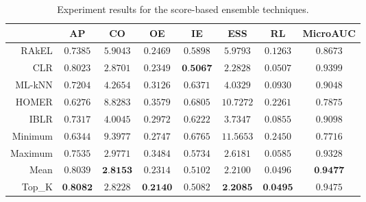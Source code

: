 \begin{table*}[ht]
	\begin{center}
	\label{tab:score-table}
		\begin{tabular}{rccccccc}
		\toprule
			 & AP & CO & OE & IE & ESS & RL & MicroAUC\\
			\midrule
			RAkEL & $0.7385$ & $5.9043$ & $0.2469$ & $0.5898$ & $5.9793$ & $0.1263$ & $0.8673$\\
			CLR & $0.8023$ & $2.8701$ & $0.2349$ & $\textbf{0.5067}$ & $2.2828$ & $0.0507$ & $0.9399$\\
			ML-kNN & $0.7204$ & $4.2654$ & $0.3126$ & $0.6371$ & $4.0329$ & $0.0930$ & $0.9048$\\
			HOMER & $0.6276$ & $8.8283$ & $0.3579$ & $0.6805$ & $10.7272$ & $0.2261$ & $0.7875$\\
			IBLR & $0.7317$ & $4.0045$ & $0.2972$ & $0.6222$ & $3.7347$ & $0.0855$ & $0.9098$\\
			Minimum & $0.6344$ & $9.3977$ & $0.2747$ & $0.6765$ & $11.5653$ & $0.2450$ & $0.7716$\\
			Maximum & $0.7535$ & $2.9771$ & $0.3484$ & $0.5734$ & $2.6181$ & $0.0585$ & $0.9328$\\
			Mean & $0.8039$ & $\textbf{2.8153}$ & $0.2314$ & $0.5102$ & $2.2100$ & $0.0496$ & $\textbf{0.9477}$\\
			Top_K & $\textbf{0.8082}$ & $2.8228$ & $\textbf{0.2140}$ & $0.5082$ & $\textbf{2.2085}$ & $\textbf{0.0495}$ & $0.9475$\\
		\bottomrule
		\end{tabular}
                \caption{Experiment results for the score-based ensemble techniques.}
	\end{center}
\end{table*}
